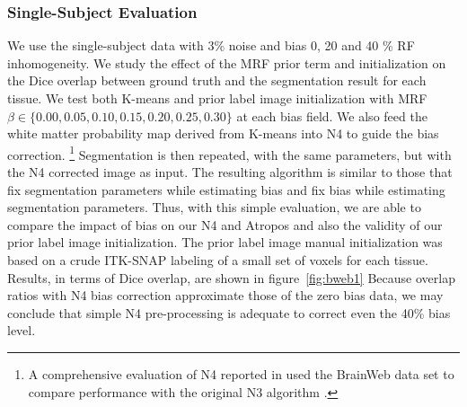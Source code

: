 \documentclass[11pt,english]{article}
\begin{document}
\subsubsection{Single-Subject Evaluation} We use the single-subject
data with 3\% noise and bias 0, 20 and 40 \% RF inhomogeneity.  We
study the effect of the MRF prior term and initialization on
the Dice overlap between ground truth and the segmentation result for
each tissue.  We test both K-means and prior label image
initialization with MRF $\beta \in \{ 0.00 , 0.05 , 0.10 , 0.15 , 0.20, 
0.25 , 0.30 \}$ at each bias field.  We also feed the white matter
probability map derived from K-means into N4 to guide the bias
correction.%
\footnote{
A comprehensive evaluation of N4 reported in \cite{Tustison2010} used the BrainWeb data set
to compare performance with the original N3 algorithm \cite{Sled1998}.
}
Segmentation is then repeated, with the same parameters,
but with the N4 corrected image as input.  The resulting algorithm is
similar to those that fix segmentation parameters while
estimating bias and fix bias while estimating segmentation parameters.
Thus, with this simple evaluation, we are able to compare the impact
of bias on our N4 and Atropos and also the validity of our
prior label image initialization.  The prior label image manual
initialization was based on a crude ITK-SNAP labeling of a small
set of voxels for each tissue.  Results, in terms of
Dice overlap, are shown in figure~\ref{fig:bweb1}  Because overlap
ratios with N4 bias correction approximate those of the zero bias data, we may
conclude that simple N4 pre-processing is adequate to correct even the 40\%
bias level.
\end{document}
